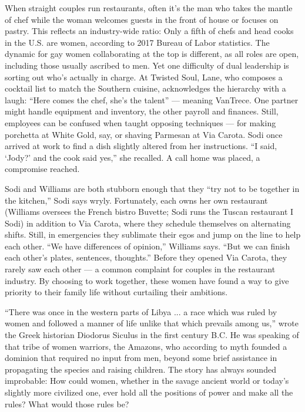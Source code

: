 When straight couples run restaurants, often it's the man who takes the
mantle of chef while the woman welcomes guests in the front of house or
focuses on pastry. This reflects an industry-wide ratio: Only a fifth of
chefs and head cooks in the U.S. are women, according to 2017 Bureau of
Labor statistics. The dynamic for gay women collaborating at the top is
different, as all roles are open, including those usually ascribed to
men. Yet one difficulty of dual leadership is sorting out who's actually
in charge. At Twisted Soul, Lane, who composes a cocktail list to match
the Southern cuisine, acknowledges the hierarchy with a laugh: ``Here
comes the chef, she's the talent'' --- meaning VanTrece. One partner
might handle equipment and inventory, the other payroll and finances.
Still, employees can be confused when taught opposing techniques --- for
making porchetta at White Gold, say, or shaving Parmesan at Via Carota.
Sodi once arrived at work to find a dish slightly altered from her
instructions. ``I said, `Jody?' and the cook said yes,'' she recalled. A
call home was placed, a compromise reached.

Sodi and Williams are both stubborn enough that they ``try not to be
together in the kitchen,'' Sodi says wryly. Fortunately, each owns her
own restaurant (Williams oversees the French bistro Buvette; Sodi runs
the Tuscan restaurant I Sodi) in addition to Via Carota, where they
schedule themselves on alternating shifts. Still, in emergencies they
sublimate their egos and jump on the line to help each other. ``We have
differences of opinion,'' Williams says. ``But we can finish each
other's plates, sentences, thoughts.'' Before they opened Via Carota,
they rarely saw each other --- a common complaint for couples in the
restaurant industry. By choosing to work together, these women have
found a way to give priority to their family life without curtailing
their ambitions.

``There was once in the western parts of Libya ... a race which was
ruled by women and followed a manner of life unlike that which prevails
among us,'' wrote the Greek historian Diodorus Siculus in the first
century B.C. He was speaking of that tribe of women warriors, the
Amazons, who according to myth founded a dominion that required no input
from men, beyond some brief assistance in propagating the species and
raising children. The story has always sounded improbable: How could
women, whether in the savage ancient world or today's slightly more
civilized one, ever hold all the positions of power and make all the
rules? What would those rules be?

